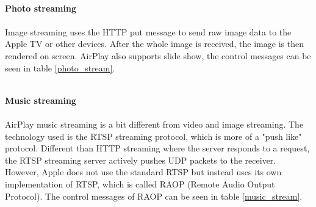 \\
\textbf{Photo streaming} \\
\\ 
Image streaming uses the HTTP put message to send raw image data to the Apple TV or 
other devices. After the whole image is received, the image is then rendered on 
screen. AirPlay also supports slide show, the control messages can be seen in 
table \ref{photo_stream}. \\
\begin{table}[htb] 
\caption{AirPlay Photo Control HTTP requests \label{photo_stream}} 
\begin{center} 
\end{center} 
\end{table} 
\\
\textbf{Music streaming} \\
\\ 
AirPlay music streaming is a bit different from video and image streaming. The 
technology used is the RTSP streaming protocol, which is more of a "push like" protocol. Different than HTTP streaming where the server responds to a request, the RTSP streaming server actively pushes UDP packets to the receiver. However, Apple does not use the standard RTSP but instead uses its own implementation of RTSP, which is called RAOP (Remote 
Audio Output Protocol). The control messages of RAOP can be seen in table 
\ref{music_stream}. \\
\begin{table}[htb] 
\caption{AirPlay Audio Control RTSP requests \label{music_stream}} 
\begin{center} 
\end{center} 
\end{table} 
